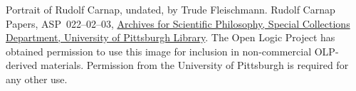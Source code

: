 Portrait of Rudolf Carnap, undated, by Trude Fleischmann. Rudolf
Carnap Papers, ASP~022--02--03,
\href{http://www.library.pitt.edu/special-collections}{Archives
for Scientific Philosophy, Special Collections Department, University
of Pittsburgh Library}. The Open Logic Project has obtained permission
to use this image for inclusion in non-commercial OLP-derived
materials. Permission from the University of Pittsburgh is required
for any other use.
